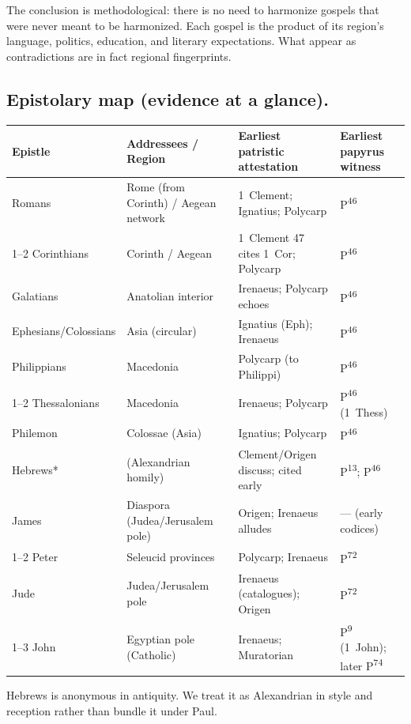 The conclusion is methodological: there is no need to harmonize gospels that were never meant to be harmonized.
Each gospel is the product of its region's language, politics, education, and literary expectations.
What appear as contradictions are in fact regional fingerprints.

\subsection{Epistolary map (evidence at a glance).}
\begin{center}
\begin{tabular}{@{}p{3.1cm}p{3.3cm}p{3.8cm}p{4.0cm}@{}}
\toprule
\textbf{Epistle} & \textbf{Addressees / Region} & \textbf{Earliest patristic attestation} & \textbf{Earliest papyrus witness} \\
\midrule
Romans & Rome (from Corinth) / Aegean network & 1~Clement; Ignatius; Polycarp & P\textsuperscript{46} \\
1--2 Corinthians & Corinth / Aegean & 1~Clement 47 cites 1~Cor; Polycarp & P\textsuperscript{46} \\
Galatians & Anatolian interior & Irenaeus; Polycarp echoes & P\textsuperscript{46} \\
Ephesians/Colossians & Asia (circular) & Ignatius (Eph); Irenaeus & P\textsuperscript{46} \\
Philippians & Macedonia & Polycarp (to Philippi) & P\textsuperscript{46} \\
1--2 Thessalonians & Macedonia & Irenaeus; Polycarp & P\textsuperscript{46} (1~Thess) \\
Philemon & Colossae (Asia) & Ignatius; Polycarp & P\textsuperscript{46} \\
Hebrews* & (Alexandrian homily) & Clement/Origen discuss; cited early & P\textsuperscript{13}; P\textsuperscript{46} \\
James & Diaspora (Judea/Jerusalem pole) & Origen; Irenaeus alludes & --- (early codices) \\
1--2 Peter & Seleucid provinces & Polycarp; Irenaeus & P\textsuperscript{72} \\
Jude & Judea/Jerusalem pole & Irenaeus (catalogues); Origen & P\textsuperscript{72} \\
1--3 John & Egyptian pole (Catholic) & Irenaeus; Muratorian & P\textsuperscript{9} (1~John); later P\textsuperscript{74} \\
\bottomrule
\end{tabular}
\end{center}
\noindent *Hebrews is anonymous in antiquity.
We treat it as Alexandrian in style and reception rather than bundle it under Paul.

